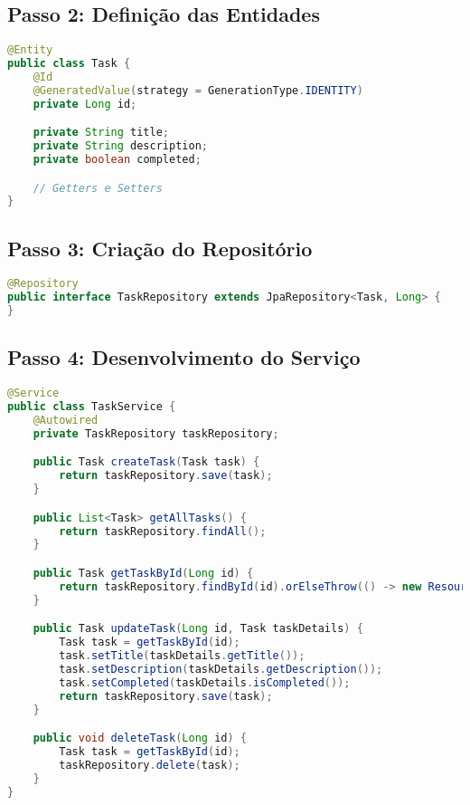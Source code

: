 \documentclass[a4paper,12pt]{book}
\begin{document}
\subsection{Passo 2: Definição das Entidades}

\begin{lstlisting}[language=Java]
@Entity
public class Task {
    @Id
    @GeneratedValue(strategy = GenerationType.IDENTITY)
    private Long id;

    private String title;
    private String description;
    private boolean completed;

    // Getters e Setters
}
\end{lstlisting}

\subsection{Passo 3: Criação do Repositório}

\begin{lstlisting}[language=Java]
@Repository
public interface TaskRepository extends JpaRepository<Task, Long> {
}
\end{lstlisting}

\subsection{Passo 4: Desenvolvimento do Serviço}

\begin{lstlisting}[language=Java]
@Service
public class TaskService {
    @Autowired
    private TaskRepository taskRepository;

    public Task createTask(Task task) {
        return taskRepository.save(task);
    }

    public List<Task> getAllTasks() {
        return taskRepository.findAll();
    }

    public Task getTaskById(Long id) {
        return taskRepository.findById(id).orElseThrow(() -> new ResourceNotFoundException("Task not found"));
    }

    public Task updateTask(Long id, Task taskDetails) {
        Task task = getTaskById(id);
        task.setTitle(taskDetails.getTitle());
        task.setDescription(taskDetails.getDescription());
        task.setCompleted(taskDetails.isCompleted());
        return taskRepository.save(task);
    }

    public void deleteTask(Long id) {
        Task task = getTaskById(id);
        taskRepository.delete(task);
    }
}
\end{lstlisting}
\end{document}
